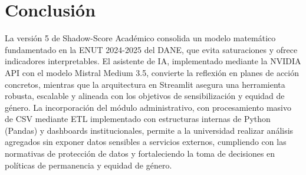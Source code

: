 \documentclass[12pt, spanish]{article}
\begin{document}
\section{Conclusión}
La versión 5 de Shadow-Score Académico consolida un modelo matemático fundamentado en la ENUT 2024-2025 del DANE, que evita saturaciones y ofrece indicadores interpretables. El asistente de IA, implementado mediante la NVIDIA API con el modelo Mistral Medium 3.5, convierte la reflexión en planes de acción concretos, mientras que la arquitectura en Streamlit asegura una herramienta robusta, escalable y alineada con los objetivos de sensibilización y equidad de género. La incorporación del módulo administrativo, con procesamiento masivo de CSV mediante ETL implementado con estructuras internas de Python (Pandas) y dashboards institucionales, permite a la universidad realizar análisis agregados sin exponer datos sensibles a servicios externos, cumpliendo con las normativas de protección de datos y fortaleciendo la toma de decisiones en políticas de permanencia y equidad de género.
\end{document}
